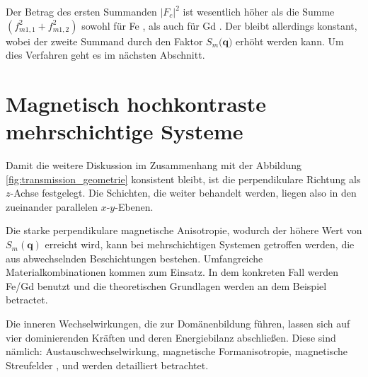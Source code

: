 \noindent
Der Betrag des ersten Summanden $\left|F_c\right|^2$ ist wesentlich höher als die Summe $(f_{m1,1}^2 + f_{m1,2}^2)$ sowohl für Fe \cite[Abb. 7]{kortright_resonant_2013}, als auch für Gd \cite[Abb. 5]{peters_soft_2004}. Der bleibt allerdings konstant, wobei der zweite Summand durch den Faktor $S_m(\mathbf{q)}$ erhöht werden kann. Um dies Verfahren geht es im nächsten Abschnitt.

\section{Magnetisch hochkontraste mehrschichtige Systeme}
Damit die weitere Diskussion im Zusammenhang mit der Abbildung \ref{fig:transmission_geometrie} konsistent bleibt, ist die perpendikulare Richtung als $z$-Achse festgelegt. Die Schichten, die weiter behandelt werden, liegen also in den zueinander parallelen $x$-$y$-Ebenen. 

\noindent
Die starke perpendikulare magnetische Anisotropie, wodurch der höhere Wert von $S_m(\mathbf{q})$ erreicht wird, kann bei mehrschichtigen Systemen getroffen werden, die aus abwechselnden Beschichtungen bestehen. Umfangreiche Materialkombinationen kommen zum Einsatz. In dem konkreten Fall werden Fe/Gd benutzt und die theoretischen Grundlagen werden an dem Beispiel betractet.

\noindent
Die inneren Wechselwirkungen, die zur Domänenbildung führen, lassen sich auf vier dominierenden Kräften und deren Energiebilanz abschließen. Diese sind nämlich: Austauschwechselwirkung, magnetische Formanisotropie, magnetische Streufelder \cite[Kap. 3.2]{hubert_magnetic_1998}, \cite{hellwig_domain_2007} und werden detailliert betrachtet.

